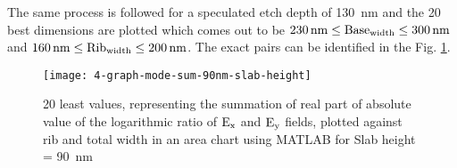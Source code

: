 \documentclass[../report.tex]{subfiles}
\begin{document}
The same process is followed for a speculated etch depth of \SI{130}{\nano \meter} and the 20 best dimensions are plotted which comes out to be $\mathrm{\SI{230}{\nano \meter} \leq Base_{width} \leq \SI{300}{\nano \meter}}$ and $\mathrm{\SI{160}{\nano \meter} \leq Rib_{width} \leq \SI{200}{\nano \meter}}$. The exact pairs can be identified in the Fig. \ref{fig:4_graph_mode_sum_90nm_slab_height}.
\begin{figure}[H] %
	\centering
	\texttt{[image: 4-graph-mode-sum-90nm-slab-height]}
	\caption{20 least values, representing the summation of real part of absolute value of the logarithmic ratio of $\mathrm{E_x}$ and $\mathrm{E_y}$ fields, plotted against rib and total width in an area chart using MATLAB for Slab height = \SI{90}{\nano \meter}}
	\label{fig:4_graph_mode_sum_90nm_slab_height}
\end{figure}

\begin{comment}

		\subsection{Design B: Tapered Si waveguide with horizontal gradual asymmetry on SOI with air cladding based on mode evolution}

\subsubsection{Optimized dimensions of bus waveguide}
		
\begin{figure}[H] %
	\begin{subfigure}[t]{0.45\textwidth}
		\texttt{[image: 3-mode1-200-200]}
		\caption{\gls{te} mode in the cross-section}
		\label{fig:4_mode1_200_200}
	\end{subfigure}
	\hfill
	\begin{subfigure}[t]{0.45\textwidth}
		\texttt{[image: 3-mode2-200-200]}
		\caption{\gls{tm} mode in the cross-section}
		\label{fig:4_mode2_200_200}
	\end{subfigure}
	\caption{Hybrid modes in the cross-section with width = 200nm, height = 220nm, obtained using Comsol 2-D simulation}
\end{figure}

\subsubsection{Optimized dimensions of MEMS waveguide}	

\subsubsection{Device tolerance}

\subsubsection{Representational design based on simulation}
\end{comment}
\end{document}
